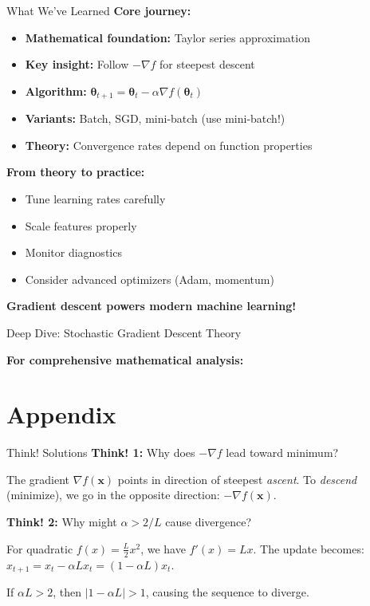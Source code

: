 \documentclass[aspectratio=169,11pt]{beamer}
\newcommand{\grad}{\nabla}
\newcommand{\vx}{\bm{x}}
\newcommand{\vtheta}{\bm{\theta}}
\begin{document}
\begin{frame}{What We've Learned}
\textbf{Core journey:}
\begin{itemize}
\item \textbf{Mathematical foundation:} Taylor series approximation
\item \textbf{Key insight:} Follow $-\grad f$ for steepest descent
\item \textbf{Algorithm:} $\vtheta_{t+1} = \vtheta_t - \alpha \grad f(\vtheta_t)$
\item \textbf{Variants:} Batch, SGD, mini-batch (use mini-batch!)
\item \textbf{Theory:} Convergence rates depend on function properties
\end{itemize}

\pause
\textbf{From theory to practice:}
\begin{itemize}
\item Tune learning rates carefully
\item Scale features properly
\item Monitor diagnostics
\item Consider advanced optimizers (Adam, momentum)
\end{itemize}

\pause
\begin{center}
\alert{\textbf{Gradient descent powers modern machine learning!}}
\end{center}
\end{frame}

\begin{frame}{Deep Dive: Stochastic Gradient Descent Theory}
\begin{center}
\textbf{For comprehensive mathematical analysis:}
\end{center}
\end{frame}



\appendix
\section{Appendix}

\begin{frame}{Think! Solutions}
\textbf{Think! 1:} Why does $-\grad f$ lead toward minimum?

The gradient $\grad f(\vx)$ points in direction of steepest \emph{ascent}. To \emph{descend} (minimize), we go in the opposite direction: $-\grad f(\vx)$.

\pause
\vspace{0.5cm}
\textbf{Think! 2:} Why might $\alpha > 2/L$ cause divergence?

For quadratic $f(x) = \frac{L}{2}x^2$, we have $f'(x) = Lx$. 
The update becomes: $x_{t+1} = x_t - \alpha L x_t = (1-\alpha L)x_t$. 

If $\alpha L > 2$, then $|1-\alpha L| > 1$, causing the sequence to diverge.
\end{frame}
\end{document}
